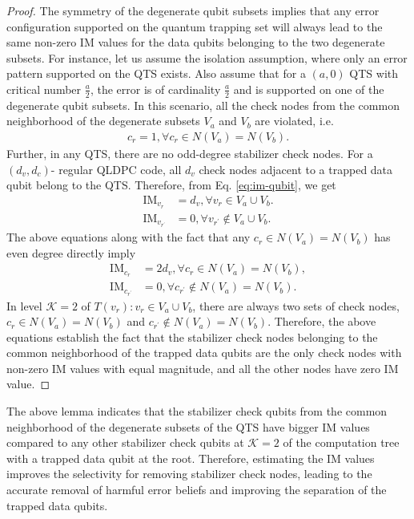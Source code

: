 \documentclass[%
 reprint,
 amsmath,amssymb,
 aps,
pra,
showkeys,
]{revtex4-2}
\begin{document}
\begin{proof}
    The symmetry of the degenerate qubit subsets implies that any error configuration supported on the quantum trapping set will always lead to the same non-zero IM values for the data qubits belonging to the two degenerate subsets.
    For instance, let us assume the isolation assumption, where only an error pattern supported on the QTS exists.
    Also assume that for a $(a,0)$ QTS with critical number $\frac{a}{2}$, the error is of cardinality $\frac{a}{2}$ and is supported on one of the degenerate qubit subsets.
    In this scenario, all the check nodes from the common neighborhood of the degenerate subsets $V_a$ and $V_b$ are violated, i.e.
    \begin{align*}
        c_r = 1, \forall c_r \in N(V_a) = N(V_b).
    \end{align*}
    Further, in any QTS, there are no odd-degree stabilizer check nodes. For a $(d_v, d_c)$- regular QLDPC code, all $d_v$ check nodes adjacent to a trapped data qubit belong to the QTS.
    Therefore, from Eq. \ref{eq:im-qubit}, we get
    \begin{align*}
        \mathrm{IM}_{v_r} &= d_v, \forall v_r \in V_a \cup V_b.\\
        \mathrm{IM}_{v_{r^{\prime}}} &= 0, \forall v_{r^{\prime}} \notin V_a \cup V_b.
    \end{align*}
    The above equations along with the fact that any $c_r \in N(V_a) = N(V_b)$ has even degree directly imply
    \begin{align*}
        \mathrm{IM}_{c_r} &= 2d_v, \forall c_r \in N(V_a) = N(V_b),\\
        \mathrm{IM}_{c_{r^{\prime}}} &= 0, \forall c_{r^{\prime}} \notin N(V_a) = N(V_b).
    \end{align*}
    In level $\mathcal{K}=2$ of $T(v_r): v_r \in V_a \cup V_b$, there are always two sets of check nodes, $c_r \in N(V_a) = N(V_b)$ and $c_{r^{\prime}} \notin N(V_a) = N(V_b)$.
    Therefore, the above equations establish the fact that the stabilizer check nodes belonging to the common neighborhood of the trapped data qubits are the only check nodes with non-zero IM values with equal magnitude, and all the other nodes have zero IM value.
\end{proof}
The above lemma indicates that the stabilizer check qubits from the common neighborhood of the degenerate subsets of the QTS have bigger IM values compared to any other stabilizer check qubits at $\mathcal{K} = 2$ of the computation tree with a trapped data qubit at the root.
Therefore, estimating the IM values improves the selectivity for removing stabilizer check nodes, leading to the accurate removal of harmful error beliefs and improving the separation of the trapped data qubits.
\end{document}
